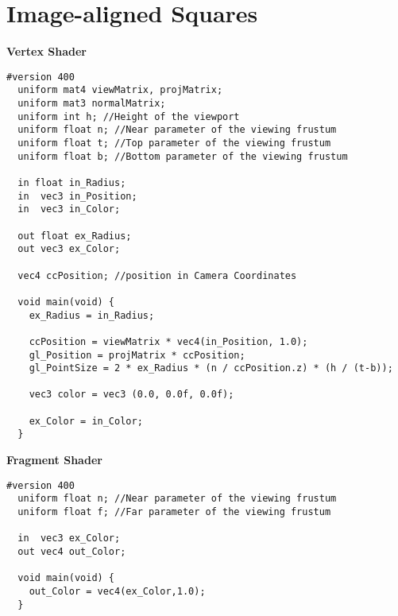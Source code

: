 \section{Image-aligned Squares \label{image-aligned}}
\textbf{Vertex Shader}
\begin{lstlisting}[frame=single]
  #version 400
  uniform mat4 viewMatrix, projMatrix;
  uniform mat3 normalMatrix;
  uniform int h; //Height of the viewport
  uniform float n; //Near parameter of the viewing frustum
  uniform float t; //Top parameter of the viewing frustum
  uniform float b; //Bottom parameter of the viewing frustum

  in float in_Radius;
  in  vec3 in_Position;
  in  vec3 in_Color;

  out float ex_Radius;
  out vec3 ex_Color;

  vec4 ccPosition; //position in Camera Coordinates

  void main(void) {
    ex_Radius = in_Radius;

    ccPosition = viewMatrix * vec4(in_Position, 1.0);
    gl_Position = projMatrix * ccPosition;
    gl_PointSize = 2 * ex_Radius * (n / ccPosition.z) * (h / (t-b));

    vec3 color = vec3 (0.0, 0.0f, 0.0f);

    ex_Color = in_Color;
  }
\end{lstlisting}

\textbf{Fragment Shader}
\begin{lstlisting}[frame=single]
  #version 400
  uniform float n; //Near parameter of the viewing frustum
  uniform float f; //Far parameter of the viewing frustum

  in  vec3 ex_Color;
  out vec4 out_Color;

  void main(void) {
    out_Color = vec4(ex_Color,1.0);
  }
\end{lstlisting}


